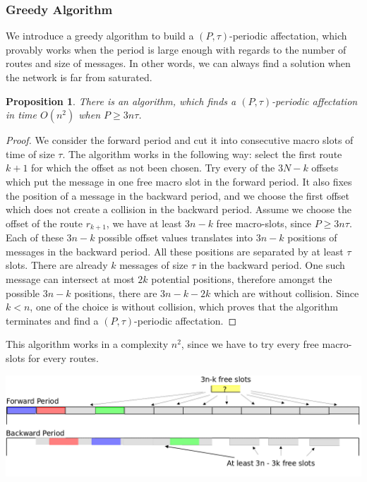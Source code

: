 \documentclass[a4paper,10pt]{article}
\newtheorem{proposition}{Proposition}
\begin{document}
    \subsubsection{Greedy Algorithm}
    
    We introduce a greedy algorithm to build a $(P,\tau)$-periodic affectation, which provably works when
    the period is large enough with regards to the number of routes and size of messages. In other words, 
    we can always find a solution when the network is far from saturated. 
    
    \begin{proposition}
    There is an algorithm, which finds a $(P,\tau)$-periodic affectation in time $O(n^2)$ when $P \geq 3n\tau$.
    \end{proposition}
    \begin{proof}
     We consider the forward period and cut it into consecutive macro slots of time of size $\tau$. The algorithm works in the following way: select the first route $k+1$ for which the offset as not been chosen. Try every of the $3N-k$ offsets which put the message in one free macro slot in the forward period. It also fixes the position of a message in the backward period, and we choose the first offset which does not create a collision in the backward period. 
     Assume we choose the offset of the route $r_{k+1}$, we have  at least $3n - k$ free macro-slots, since $P \geq 3n\tau$. Each of these $3n - k$ possible offset values translates into $3n - k$ positions of messages in the backward period. All these positions are separated by at least $\tau$ slots. There are already $k$ messages of size $\tau$ in the backward period. One such message can intersect at most $2k$ potential positions, therefore  amongst the possible $3n - k$ positions, there are  $3n - k -2k$ which are without collision. Since $k < n$, one of the choice is without collision, which proves that the algorithm terminates and find a
     $(P,\tau)$-periodic affectation. 
     \end{proof}
     This algorithm works in a complexity $n^2$, since we have to try every free macro-slots for every routes.
      \begin{center}
      \includegraphics[scale=0.3]{ex3nt.png}
      \end{center}
\end{document}

